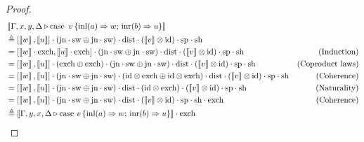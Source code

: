 \documentclass[10pt,a4paper]{amsart}
\theoremstyle{definition}
\theoremstyle{definition}
\theoremstyle{definition}
\theoremstyle{definition}
\theoremstyle{definition}
\theoremstyle{definition}
\begin{document}
\begin{proof}
\begin{align*}
  & \sem{\Gamma,x, y, \Delta \vljud \text{case } \, v\, \{\text{inl} (a) \Rightarrow w ;\, \text{inr} (b) \Rightarrow u\}} \\
  & \triangleq  [\sem{w} ,\sem{u}]\comp (\text{jn}
  \comp \sw \oplus \text{jn} \comp \sw) 
  \comp \dist \comp (\sem{v} \otimes \id) \comp 
  \text{sp}_{} 
  \comp \text{sh}_{}  \\
  & = [\sem{ w }  \comp \text{exch}, \sem{u}\comp \text{exch}] \comp (\text{jn}\comp \sw \oplus \text{jn} \comp \sw) \comp \dist \comp (\sem{v} \otimes \id) \comp\text{sp} \comp \text{sh}
  & \text{(Induction)}\\
  & = [\sem{ w }, \sem{u}] 
  \comp (\text{exch} \oplus \text{exch}) 
  \comp (\text{jn}\comp \sw \oplus \text{jn} \comp \sw) 
  \comp \dist \comp (\sem{v} \otimes \id) \comp\text{sp} \comp \text{sh} 
  & \text{(Coproduct laws)}
  \\
  & = [\sem{ w }, \sem{u}] 
  \comp (\text{jn}\comp \sw \oplus \text{jn} \comp \sw) 
  \comp (\id \otimes \text{exch} \oplus \id \otimes \text{exch})
  \comp \dist \comp (\sem{v} \otimes \id) \comp\text{sp} \comp \text{sh} 
  & \text{(Coherence)}
  \\
  & = [\sem{ w }, \sem{u}] 
  \comp (\text{jn}\comp \sw \oplus \text{jn} \comp \sw) 
  \comp \dist 
  \comp (\id \otimes \text{exch}) \comp (\sem{v} \otimes \id) \comp\text{sp} \comp \text{sh} 
  & \text{(Naturality)}
  \\
  & = [\sem{ w }, \sem{u}] 
  \comp (\text{jn}\comp \sw \oplus \text{jn} \comp \sw) 
  \comp \dist 
  \comp (\sem{v} \otimes \id) \comp\text{sp} \comp \text{sh} 
  \comp \text{exch}
  & \text{(Coherence)}
  \\
  & \triangleq \sem{\Gamma,y, x, \Delta \vljud \text{case } v\,  \{\text{inl} (a) \Rightarrow w ;\, \text{inr} (b) \Rightarrow u\}} 
  \comp \text{exch}_{}

\end{align*}
\end{proof}
\end{document}

